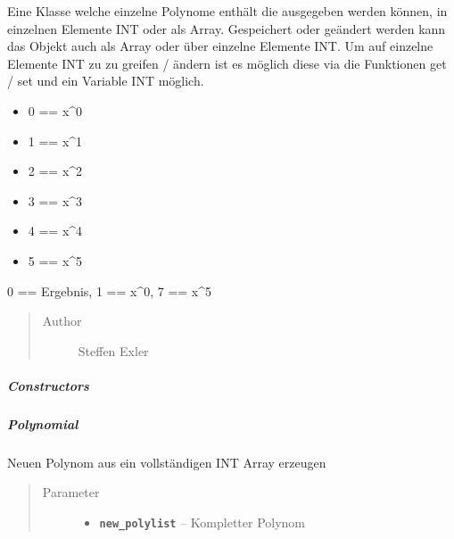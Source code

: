 \documentclass[letterpaper,10pt,ngerman]{sphinxmanual}
\begin{document}
\begin{fulllineitems}
\label{com/linuxluigi/polynomial/Polynomial:com.linuxluigi.polynomial.Polynomial}
Eine Klasse welche einzelne Polynome enthält die ausgegeben werden können, in einzelnen Elemente INT oder als Array. Gespeichert oder geändert werden kann das Objekt auch als Array oder über einzelne Elemente INT. Um auf einzelne Elemente INT zu zu greifen / ändern ist es möglich diese via die Funktionen get / set und ein Variable INT möglich.
\begin{itemize}
\item {} 
0 == x\textasciicircum{}0

\item {} 
1 == x\textasciicircum{}1

\item {} 
2 == x\textasciicircum{}2

\item {} 
3 == x\textasciicircum{}3

\item {} 
4 == x\textasciicircum{}4

\item {} 
5 == x\textasciicircum{}5

\end{itemize}

0 == Ergebnis, 1 == x\textasciicircum{}0, 7 == x\textasciicircum{}5
\begin{quote}\begin{description}
\item[{Author}] \leavevmode
Steffen Exler

\end{description}\end{quote}

\end{fulllineitems}



\subparagraph{Constructors}
\label{com/linuxluigi/polynomial/Polynomial:constructors}

\subparagraph{Polynomial}
\label{com/linuxluigi/polynomial/Polynomial:id1}

\begin{fulllineitems}
\label{com/linuxluigi/polynomial/Polynomial:com.linuxluigi.polynomial.Polynomial.Polynomial(double__)}
Neuen Polynom aus ein vollständigen INT Array erzeugen
\begin{quote}\begin{description}
\item[{Parameter}] \leavevmode\begin{itemize}
\item {} 
\textbf{\texttt{new\_polylist}} -- Kompletter Polynom

\end{itemize}

\end{description}\end{quote}

\end{fulllineitems}
\end{document}
